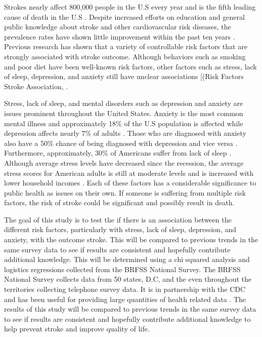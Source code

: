 \documentclass[11pt,]{article}
\begin{document}
Strokes nearly affect 800,000 people in the U.S every year and is the
fifth leading cause of death in the U.S
\citep{AmericanStrokeAssociation2017}. Despite increased efforts on
education and general public knowledge about stroke and other
cardiovascular risk diseases, the prevalence rates have shown little
improvement within the past ten years \citep{Mozaffarian2015}. Previous
research has shown that a variety of controllable risk factors that are
strongly associated with stroke outcome. Although behaviors such as
smoking and poor diet have been well-known risk factors, other factors
such as stress, lack of sleep, depression, and anxiety still have
unclear associations {[}(Risk Factors Stroke Association,
\citep{AmericanStrokeAssociation2017a}.

Stress, lack of sleep, and mental disorders such as depression and
anxiety are issues prominent throughout the United States. Anxiety is
the most common mental illness and approximately 18\% of the U.S
population is affected while depression affects nearly 7\% of adults
\citep{AnxietyandDepressionAssociationofAmerica2017}. Those who are
diagnosed with anxiety also have a 50\% chance of being diagnosed with
depression and vice versa
\citep{AnxietyandDepressionAssociationofAmerica2017}. Furthermore,
approximately, 30\% of Americans suffer from lack of sleep
\citep{CentersforDiseaseControlandPrevention2015}. Although average
stress levels have decreased since the recession, the average stress
scores for American adults is still at moderate levels and is increased
with lower household incomes
\citep{AmericanPsychologicalAssociation2015}. Each of these factors has
a considerable significance to public health as issues on their own. If
someone is suffering from multiple risk factors, the risk of stroke
could be significant and possibly result in death.

The goal of this study is to test the if there is an association between
the different risk factors, particularly with stress, lack of sleep,
depression, and anxiety, with the outcome stroke. This will be compared
to previous trends in the same survey data to see if results are
consistent and hopefully contribute additional knowledge. This will be
determined using a chi squared analysis and logistics regressions
collected from the BRFSS National Survey. The BRFSS National Survey
collects data from 50 states, D.C, and the even throughout the
territories collecting telephone survey data. It is in partnership with
the CDC and has been useful for providing large quantities of health
related data \citep{CentersforDiseaseControlandPrevention2014}. The
results of this study will be compared to previous trends in the same
survey data to see if results are consistent and hopefully contribute
additional knowledge to help prevent stroke and improve quality of life.
\end{document}
